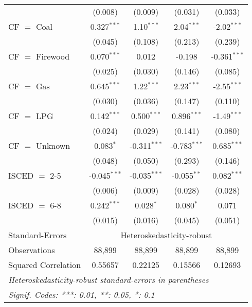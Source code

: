 \begin{table}[htbp!]
\begin{adjustbox}{width = 1\textwidth, max height = 0.95\textheight, center}
\begin{threeparttable}[b]
\begin{tabular}{lcccc}
                                 & (0.008)            & (0.009)            & (0.031)        & (0.033)\\   
            CF $=$ Coal          & 0.327$^{***}$      & 1.10$^{***}$       & 2.04$^{***}$   & -2.02$^{***}$\\   
                                 & (0.045)            & (0.108)            & (0.213)        & (0.239)\\   
            CF $=$ Firewood      & 0.070$^{***}$      & 0.012              & -0.198         & -0.361$^{***}$\\   
                                 & (0.025)            & (0.030)            & (0.146)        & (0.085)\\   
            CF $=$ Gas           & 0.645$^{***}$      & 1.22$^{***}$       & 2.23$^{***}$   & -2.55$^{***}$\\   
                                 & (0.030)            & (0.036)            & (0.147)        & (0.110)\\   
            CF $=$ LPG           & 0.142$^{***}$      & 0.500$^{***}$      & 0.896$^{***}$  & -1.49$^{***}$\\   
                                 & (0.024)            & (0.029)            & (0.141)        & (0.080)\\   
            CF $=$ Unknown       & 0.083$^{*}$        & -0.311$^{***}$     & -0.783$^{***}$ & 0.685$^{***}$\\   
                                 & (0.048)            & (0.050)            & (0.293)        & (0.146)\\   
            ISCED $=$ 2-5        & -0.045$^{***}$     & -0.035$^{***}$     & -0.055$^{**}$  & 0.082$^{***}$\\   
                                 & (0.006)            & (0.009)            & (0.028)        & (0.028)\\   
            ISCED $=$ 6-8        & 0.242$^{***}$      & 0.028$^{*}$        & 0.080$^{*}$    & 0.071\\   
                                 & (0.015)            & (0.016)            & (0.045)        & (0.051)\\   
            \midrule 
            Standard-Errors & \multicolumn{4}{c}{Heteroskedasticity-robust} \\ 
            Observations         & 88,899             & 88,899             & 88,899         & 88,899\\  
            Squared Correlation  & 0.55657            & 0.22125            & 0.15566        & 0.12693\\  
            \midrule \midrule
            \multicolumn{5}{l}{\emph{Heteroskedasticity-robust standard-errors in parentheses}}\\
            \multicolumn{5}{l}{\emph{Signif. Codes: ***: 0.01, **: 0.05, *: 0.1}}\\
         \end{tabular}
         

\end{threeparttable}
\end{adjustbox}
\end{table}

